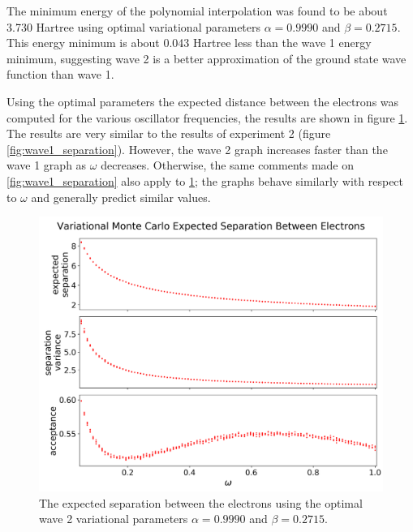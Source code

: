 \documentclass[nofootinbib,reprint,english]{revtex4-1}
\begin{document}
The minimum energy of the polynomial interpolation was found to be about 3.730 Hartree using optimal variational parameters \(\alpha=0.9990\) and \(\beta=0.2715\). This energy minimum is about 0.043 Hartree less than the wave 1 energy minimum, suggesting wave 2 is a better approximation of the ground state wave function than wave 1.

Using the optimal parameters the expected distance between the electrons was computed for the various oscillator frequencies, the results are shown in figure \ref{fig:wave2_separation}. The results are very similar to the results of experiment 2 (figure \ref{fig:wave1_separation}). However, the wave 2 graph increases faster than the wave 1 graph as \(\omega\) decreases. Otherwise, the same comments made on \ref{fig:wave1_separation} also apply to \ref{fig:wave2_separation}; the graphs behave similarly with respect to \(\omega\) and generally predict similar values.

\begin{figure}[h!]
\centering
\includegraphics[scale=0.34]{../results/wave2/expected_separation_1_edited.png}
\caption{The expected separation between the electrons using the optimal wave 2 variational parameters \(\alpha=0.9990\) and \(\beta=0.2715\).}\label{fig:wave2_separation}
\end{figure}
\end{document}
